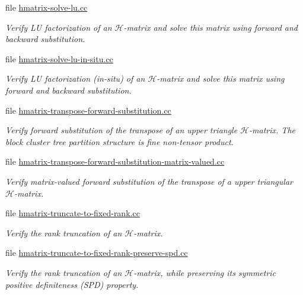 \begin{DoxyCompactItemize}
file \hyperlink{hmatrix-solve-lu_8cc}{hmatrix-\/solve-\/lu.\+cc}
\begin{DoxyCompactList}\small\item\em Verify LU factorization of an $\mathcal{H}$-\/matrix and solve this matrix using forward and backward substitution. \end{DoxyCompactList}\item 
file \hyperlink{hmatrix-solve-lu-in-situ_8cc}{hmatrix-\/solve-\/lu-\/in-\/situ.\+cc}
\begin{DoxyCompactList}\small\item\em Verify LU factorization (in-\/situ) of an $\mathcal{H}$-\/matrix and solve this matrix using forward and backward substitution. \end{DoxyCompactList}\item 
file \hyperlink{hmatrix-transpose-forward-substitution_8cc}{hmatrix-\/transpose-\/forward-\/substitution.\+cc}
\begin{DoxyCompactList}\small\item\em Verify forward substitution of the transpose of an upper triangle $\mathcal{H}$-\/matrix. The block cluster tree partition structure is fine non-\/tensor product. \end{DoxyCompactList}\item 
file \hyperlink{hmatrix-transpose-forward-substitution-matrix-valued_8cc}{hmatrix-\/transpose-\/forward-\/substitution-\/matrix-\/valued.\+cc}
\begin{DoxyCompactList}\small\item\em Verify matrix-\/valued forward substitution of the transpose of a upper triangular $\mathcal{H}$-\/matrix. \end{DoxyCompactList}\item 
file \hyperlink{hmatrix-truncate-to-fixed-rank_8cc}{hmatrix-\/truncate-\/to-\/fixed-\/rank.\+cc}
\begin{DoxyCompactList}\small\item\em Verify the rank truncation of an $\mathcal{H}$-\/matrix. \end{DoxyCompactList}\item 
file \hyperlink{hmatrix-truncate-to-fixed-rank-preserve-spd_8cc}{hmatrix-\/truncate-\/to-\/fixed-\/rank-\/preserve-\/spd.\+cc}
\begin{DoxyCompactList}\small\item\em Verify the rank truncation of an $\mathcal{H}$-\/matrix, while preserving its symmetric positive definiteness (S\+PD) property. \end{DoxyCompactList}\item 

\end{DoxyCompactItemize}
